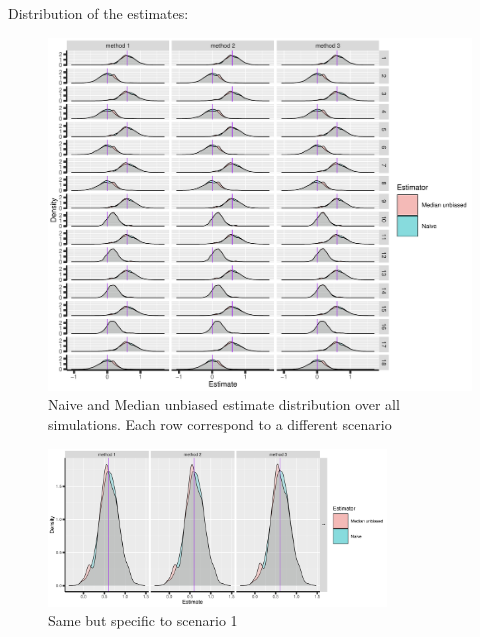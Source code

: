 \documentclass[12pt]{article}
\begin{document}
Distribution of the estimates:
\begin{figure}[!h]
\centering
\includegraphics[trim={0 0 0 0},width=1\textwidth]{./figures/gg-estimate-density.pdf}
\caption{Naive and Median unbiased estimate distribution over all simulations. Each row correspond to a different scenario}
\end{figure}

\begin{figure}[!h]
\centering
\includegraphics[trim={0 0 0 0},width=0.8\textwidth]{./figures/gg-estimate-density-scenario1.pdf}
\caption{Same but specific to scenario 1}
\end{figure}

\clearpage
\end{document}

